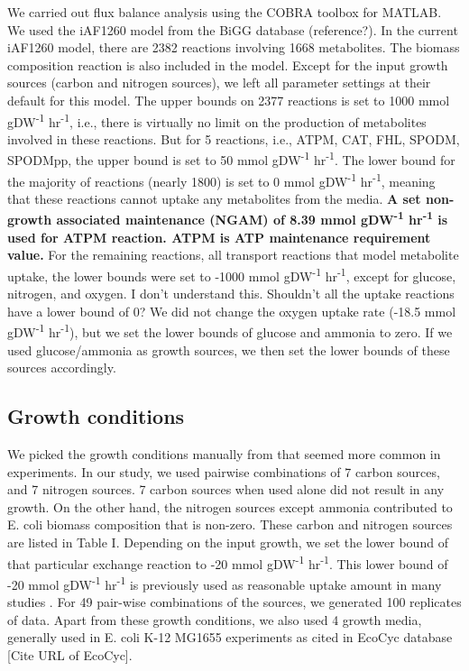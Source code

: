 \documentclass[12pt]{article}
\begin{document}
We carried out flux balance analysis using the COBRA toolbox \cite{Schellenbergeretal2011} for MATLAB. 
We used the iAF1260 model from the BiGG database \cite{Schellenbergeretal2010} ({\color{red}reference?}). In the current iAF1260 model, there are 2382 reactions involving 1668 metabolites. The biomass composition reaction is also included in the model. Except for the input growth sources (carbon and nitrogen sources), we left all parameter settings at their default for this model. The upper bounds on 2377 reactions is set to 1000  mmol gDW\textsuperscript{-1} hr\textsuperscript{-1}, i.e., there is virtually no limit on the production of metabolites involved in these reactions. But for 5 reactions, i.e., ATPM, CAT, FHL, SPODM, SPODMpp, the upper bound is set to 50 mmol gDW\textsuperscript{-1} hr\textsuperscript{-1}. The lower bound for the majority of reactions (nearly 1800) is set to 0 mmol gDW\textsuperscript{-1} hr\textsuperscript{-1}, meaning that these reactions cannot uptake any metabolites from the media. \textbf{A set non-growth associated maintenance (NGAM) of 8.39  mmol gDW\textsuperscript{-1} hr\textsuperscript{-1} is used for ATPM reaction. ATPM is ATP maintenance requirement value.} For the remaining reactions, all transport reactions that model metabolite uptake, the lower bounds were set to -1000 mmol gDW\textsuperscript{-1} hr\textsuperscript{-1}, except for glucose, nitrogen, and oxygen. {\color{red}I don't understand this. Shouldn't all the uptake reactions have a lower bound of 0?} We did not change the oxygen uptake rate (-18.5 mmol gDW\textsuperscript{-1} hr\textsuperscript{-1}), but we set the lower bounds of glucose and ammonia to zero. If we used glucose/ammonia as growth sources, we then set the lower bounds of these sources accordingly.

\subsection*{Growth conditions} 
We picked the growth conditions manually from \cite{Feistetal2007} that seemed more common in experiments. In our study, we used pairwise combinations of 7 carbon sources, and 7 nitrogen sources. 7 carbon sources when used alone did not result in any growth. On the other hand, the nitrogen sources except ammonia contributed to E. coli biomass composition that is non-zero. These carbon and nitrogen sources are listed in Table I. Depending on the input growth, we set the lower bound of that particular exchange reaction to -20 mmol gDW\textsuperscript{-1} hr\textsuperscript{-1}. This lower bound of -20 mmol gDW\textsuperscript{-1} hr\textsuperscript{-1} is previously used as reasonable uptake amount in many studies \cite{Feistetal2007}. For 49 pair-wise combinations of the sources, we generated 100 replicates of data. Apart from these growth conditions, we also used 4 growth media, generally used in E. coli K-12 MG1655 experiments as cited in EcoCyc database [Cite URL of EcoCyc].
\end{document}
